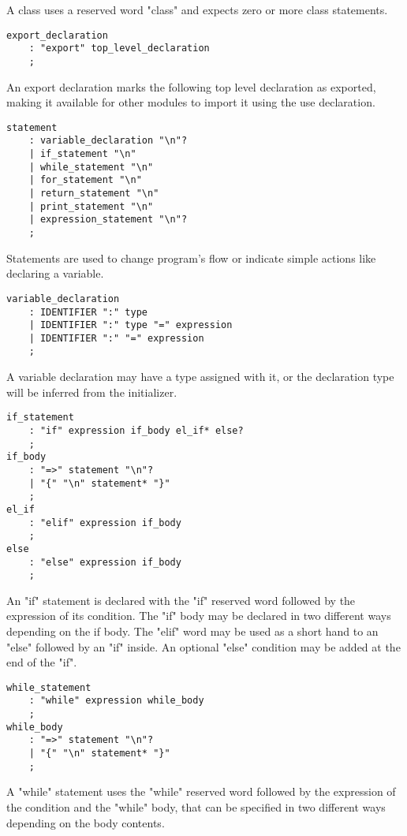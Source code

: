 A class uses a reserved word "class" and expects zero or more class statements.

\begin{lstlisting}
export_declaration
    : "export" top_level_declaration
    ;
\end{lstlisting}

An export declaration marks the following top level declaration as exported, making it available for other modules to import it using the
use declaration.

\begin{lstlisting}
statement
    : variable_declaration "\n"?
    | if_statement "\n"
    | while_statement "\n"
    | for_statement "\n"
    | return_statement "\n"
    | print_statement "\n"
    | expression_statement "\n"?
    ;
\end{lstlisting}

Statements are used to change program's flow or indicate simple actions like declaring a variable.

\begin{lstlisting}
variable_declaration
    : IDENTIFIER ":" type
    | IDENTIFIER ":" type "=" expression
    | IDENTIFIER ":" "=" expression
    ;
\end{lstlisting}

A variable declaration may have a type assigned with it, or the declaration type will be inferred from the initializer.

\begin{lstlisting}
if_statement
    : "if" expression if_body el_if* else?
    ;
if_body
    : "=>" statement "\n"?
    | "{" "\n" statement* "}"
    ;
el_if
    : "elif" expression if_body
    ;
else
    : "else" expression if_body
    ;
\end{lstlisting}

An "if" statement is declared with the "if" reserved word followed by the expression of its condition.
The "if" body may be declared in two different ways depending on the if body. The "elif" word may be used as a short
hand to an "else" followed by an "if" inside. An optional "else" condition may be added at the end of the "if".

\begin{lstlisting}
while_statement
    : "while" expression while_body
    ;
while_body
    : "=>" statement "\n"?
    | "{" "\n" statement* "}"
    ;
\end{lstlisting}

A "while" statement uses the "while" reserved word followed by the expression of the condition and the "while" body, that can be specified
in two different ways depending on the body contents.

